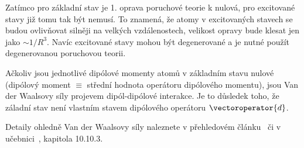 \begin{solution}
	Zatímco pro základní stav je 1. oprava poruchové teorie k nulová, pro excitované stavy již tomu tak být nemusí.
	To znamená, že atomy v excitovaných stavech se budou ovlivňovat silněji na velkých vzdálenostech, velikost opravy bude klesat jen jako $\sim1/R^{3}$.
	Navíc excitované stavy mohou být degenerované a je nutné použít degenerovanou poruchovou teorii.

	Ačkoliv jsou jednotlivé dipólové momenty atomů v základním stavu nulové (dipólový moment $\equiv$ střední hodnota operátoru dipólového momentu),
	jsou Van der Waalsovy síly projevem dipól-dipólové interakce.
	Je to důsledek toho, že záladní stav není vlastním stavem dipólového operátoru $\vectoroperator{d}$.
		
	Detaily ohledně Van der Waalsovy síly naleznete v přehledovém článku~\cite{Margenau1939} či v učebnici~\cite{Formanek2004}, kapitola 10.10.3.
\end{solution}